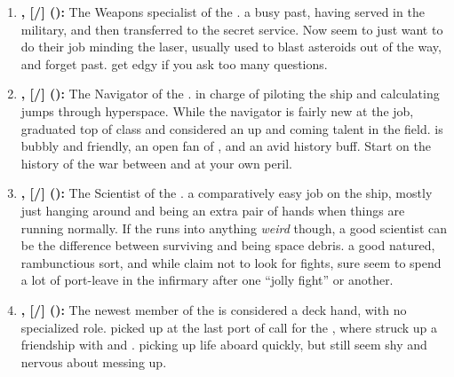 \documentclass[blue]{TMFHope}
\begin{document}
\begin{enumerate}
  \item \textbf{\cWeap{\full}, [\cWeap{\they}/\cWeap{\them}] (\cWeap{\MYplayer}):} The Weapons specialist of the \pNew{}. \cWeap{\They} \cWeap{\have} a busy past, having served in the military, and then transferred to the secret service. Now \cWeap{\they} seem\cWeap{\plural} to just want to do their job minding the \pNew{} laser, usually used to blast asteroids out of the way, and forget \cWeap{\their} past. \cWeap{} get\cWeap{\plural} edgy if you ask too many questions.
  
  \item \textbf{\cNav{\full}, [\cNav{\they}/\cNav{\them}] (\cNav{\MYplayer}):} The Navigator of the \pNew{}. \cNav{\They} \cNav{\are} in charge of piloting the ship and calculating jumps through hyperspace. While the \pNew{} navigator is fairly new at the job, \cNav{\they} graduated top of \cNav{\their} class and \cNav{\are} considered an up and coming talent in the field. \cNav{} is bubbly and friendly, an open fan\cNav{\kid} of \cCap{}, and an avid history buff. Start \cNav{\them} on the history of the war between \pPlan{} and \pEdge{} at your own peril.
  
  \item \textbf{\cSci{\full}, [\cSci{\they}/\cSci{\them}] (\cSci{\MYplayer}):} The Scientist of the \pNew{}. \cSci{\They} \cSci{\have} a comparatively easy job on the ship, mostly just hanging around and being an extra pair of hands when things are running normally. If the \pNew{} runs into anything \emph{weird} though, a good scientist can be the difference between surviving and being space debris. \cSci{\They} \cSci{\are} a good natured, rambunctious sort, and while \cSci{\they} claim not to look for fights, \cSci{\they} sure seem\cSci{\plural} to spend a lot of \cSci{\their} port-leave in the infirmary after one ``jolly fight'' or another.
  
  \item \textbf{\cBoy{\full}, [\cBoy{\they}/\cBoy{\them}] (\cBoy{\MYplayer}):} The newest member of the \pNew{} is considered a deck hand, with no specialized role. \cBoy{\They} \cBoy{\were} picked up at the last port of call for the \pNew{}, where \cBoy{\they} struck up a friendship with \cEng{} and \cNav{}. \cBoy{\They} \cBoy{\are} picking up life aboard \pNew{} quickly, but still seem shy and nervous about messing up.
\end{enumerate}
\end{document}
